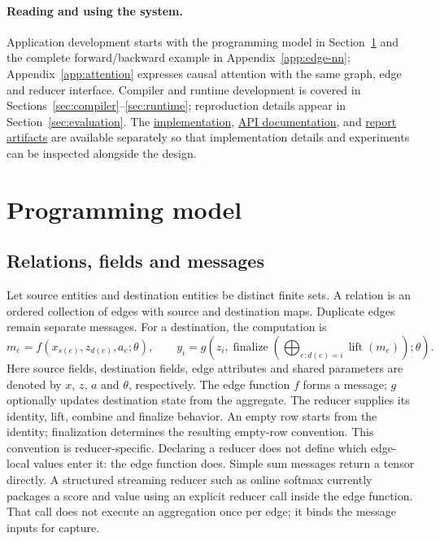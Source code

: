 \paragraph{Reading and using the system.}
Application development starts with the programming model in
Section~\ref{sec:programming-model} and the complete forward/backward example in
Appendix~\ref{app:edge-nn}; Appendix~\ref{app:attention} expresses causal attention
with the same graph, edge and reducer interface. Compiler and runtime development is covered in
Sections~\ref{sec:compiler}--\ref{sec:runtime}; reproduction details appear in
Section~\ref{sec:evaluation}. The
\href{https://github.com/walkerchi/TIGA-lang}{implementation},
\href{https://walkerchi.github.io/TIGA-lang/}{API documentation}, and
\href{https://github.com/walkerchi/tiga-lang-paper}{report artifacts}
are available separately so that implementation details and experiments can
be inspected alongside the design.



\section{Programming model}
\label{sec:programming-model}
\subsection{Relations, fields and messages}
Let source entities and destination entities be distinct finite sets. A relation
is an ordered collection of edges with source and destination maps. Duplicate
edges remain separate messages. For a destination, the computation is
$$
 m_e = f(x_{s(e)}, z_{d(e)}, a_e;\theta),\qquad
 y_i = g\!\left(z_i,\operatorname{finalize}\left(
       \bigoplus_{e:d(e)=i}\operatorname{lift}(m_e)\right);\theta\right).
$$
Here source fields, destination fields, edge attributes and shared parameters
are denoted by $x$, $z$, $a$ and $\theta$, respectively. The edge function $f$
forms a message; $g$ optionally updates destination state from the aggregate.
The reducer supplies its identity, lift, combine and finalize behavior.
An empty row starts from the identity; finalization determines the resulting
empty-row convention. This convention is reducer-specific. Declaring a reducer
does not define which edge-local values enter it: the edge function does.
Simple sum messages return a tensor directly. A structured streaming reducer
such as online softmax currently packages a score and value using an explicit
reducer call inside the edge function. That call does not execute an aggregation
once per edge; it binds the message inputs for capture.

